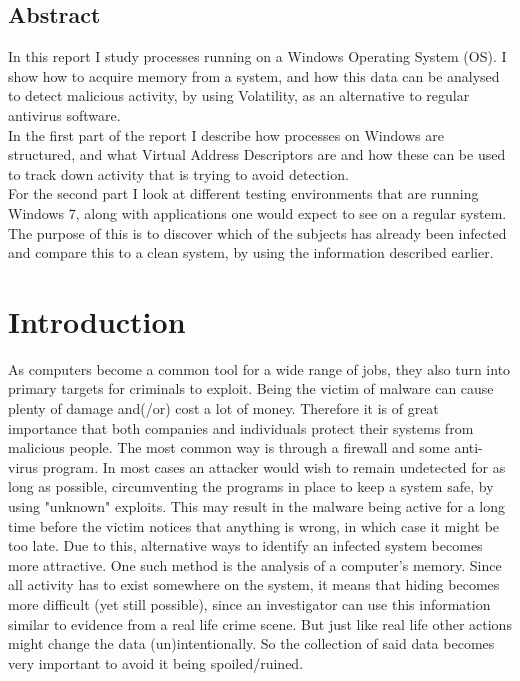 \documentclass[a4paper]{article}
\author{Kristian Hougaard Olsen \inst{1}}
\begin{document}
\subsection*{Abstract}
In this report I study processes running on a Windows Operating System (OS). I show how to acquire memory from a system, and how this data can be analysed to detect malicious activity, 
by using Volatility, as an alternative to regular antivirus software. \\
%
In the first part of the report I describe how processes on Windows are structured, and what Virtual Address Descriptors are and how these can be used to track down activity that is trying to avoid detection. \\
%
For the second part I look at different testing environments that are running Windows 7, along with applications one would expect to see on a regular system. 
The purpose of this is to discover which of the subjects has already been infected and compare this to a clean system, by using the information described earlier. \\


\newpage

\tableofcontents

\newpage

\section{Introduction}


As computers become a common tool for a wide range of jobs, they also turn into primary targets for criminals to exploit. Being the victim of malware can cause plenty of damage and(/or) cost a lot of money. 
Therefore it is of great importance that both companies and individuals protect their systems from malicious people. The most common way is through a firewall and some anti-virus program. 
In most cases an attacker would wish to remain undetected for as long as possible, circumventing the programs in place to keep a system safe, by using "unknown" exploits. 
This may result in the malware being active for a long time before the victim notices that anything is wrong, in which case it might be too late.
Due to this, alternative ways to identify an infected system becomes more attractive. One such method is the analysis of a computer's memory. 
Since all activity has to exist somewhere on the system, it means that hiding becomes more difficult (yet still possible), since an investigator can use this information similar to evidence from a real life crime scene. 
But just like real life other actions might change the data (un)intentionally. So the collection of said data becomes very important to avoid it being spoiled/ruined.
\end{document}
